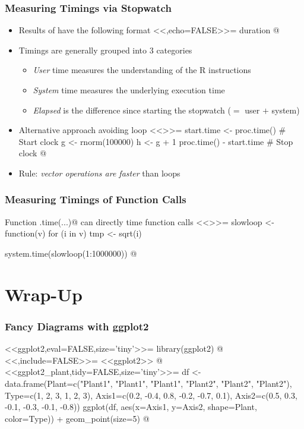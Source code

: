\documentclass[%
  final,
  11pt, 
  show notes, %
  t, %
  fleqn, %
]{beamer}
\begin{document}
\begin{frame}[fragile]
  \frametitle{Measuring Timings via Stopwatch}
\begin{itemize}
\item Results of \verb@duration@ have the following format
<<,echo=FALSE>>=
duration
@
\item Timings are generally grouped into 3 categories
\begin{itemize}
\item \emph{User} time measures the understanding of the R instructions
\item \emph{System} time measures the underlying execution time
\item \emph{Elapsed} is the difference since starting the stopwatch ($=$ user $+$ system)
\end{itemize}
\item Alternative approach avoiding loop
<<>>=
start.time <- proc.time() # Start clock
g <- rnorm(100000)
h <- g + 1
proc.time() - start.time # Stop clock
@
\item Rule: \emph{vector operations are faster} than loops
\end{itemize}	
\end{frame}

\begin{frame}[fragile]
   \frametitle{Measuring Timings of Function Calls}
Function \verb@system.time(...)@ can directly time function calls
<<>>=
slowloop <- function(v){ 
	for (i in v) {
	  tmp <- sqrt(i)
	}
}

system.time(slowloop(1:1000000)) 
@
\end{frame}

\section{Wrap-Up}

\begin{frame}[fragile]
  \frametitle{Fancy Diagrams with ggplot2}
<<ggplot2,eval=FALSE,size='tiny'>>=
library(ggplot2)
@%
<<,include=FALSE>>=
<<ggplot2>>
@%
\vspace*{-0.5cm}
<<ggplot2_plant,tidy=FALSE,size='tiny'>>=
df <- data.frame(Plant=c("Plant1", "Plant1", "Plant1", "Plant2", "Plant2", "Plant2"), 
                 Type=c(1, 2, 3, 1, 2, 3), 
                 Axis1=c(0.2, -0.4, 0.8, -0.2, -0.7, 0.1), 
                 Axis2=c(0.5, 0.3, -0.1, -0.3, -0.1, -0.8))
ggplot(df, aes(x=Axis1, y=Axis2, shape=Plant, 
               color=Type)) + geom_point(size=5)
@
\end{frame}
\end{document}
